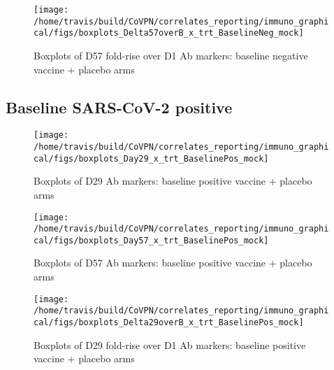 \documentclass[]{book}
\theoremstyle{definition}
\theoremstyle{definition}
\theoremstyle{definition}
\newcommand{\1}{\mathbbm{1}}
\begin{document}
\clearpage
\begin{figure}[H]

{\centering \texttt{[image: /home/travis/build/CoVPN/correlates\_reporting/immuno\_graphical/figs/boxplots\_Delta57overB\_x\_trt\_BaselineNeg\_mock]} 

}

\caption{Boxplots of D57 fold-rise over D1 Ab markers: baseline negative vaccine + placebo arms}\label{fig:unnamed-chunk-40}
\end{figure}

\clearpage

\hypertarget{baseline-sars-cov-2-positive-2}{%
\subsection{Baseline SARS-CoV-2 positive}\label{baseline-sars-cov-2-positive-2}}

\begin{figure}[H]

{\centering \texttt{[image: /home/travis/build/CoVPN/correlates\_reporting/immuno\_graphical/figs/boxplots\_Day29\_x\_trt\_BaselinePos\_mock]} 

}

\caption{Boxplots of D29 Ab markers: baseline positive vaccine + placebo arms}\label{fig:unnamed-chunk-41}
\end{figure}

\clearpage
\begin{figure}[H]

{\centering \texttt{[image: /home/travis/build/CoVPN/correlates\_reporting/immuno\_graphical/figs/boxplots\_Day57\_x\_trt\_BaselinePos\_mock]} 

}

\caption{Boxplots of D57 Ab markers: baseline positive vaccine + placebo arms}\label{fig:unnamed-chunk-42}
\end{figure}

\clearpage
\begin{figure}[H]

{\centering \texttt{[image: /home/travis/build/CoVPN/correlates\_reporting/immuno\_graphical/figs/boxplots\_Delta29overB\_x\_trt\_BaselinePos\_mock]} 

}

\caption{Boxplots of D29 fold-rise over D1 Ab markers: baseline positive vaccine + placebo arms}\label{fig:unnamed-chunk-43}
\end{figure}
\end{document}
